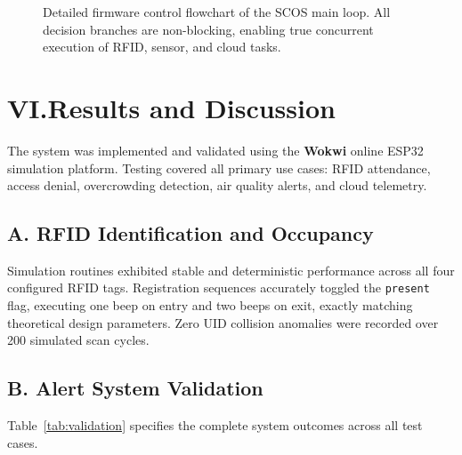 \documentclass[12pt,a4paper]{article}
\begin{document}
\begin{figure}[H]
\caption{Detailed firmware control flowchart of the SCOS main loop. All decision branches
are non-blocking, enabling true concurrent execution of RFID, sensor, and cloud tasks.}
\label{fig:flowchart}
\end{figure}

\section*{VI.\quad Results and Discussion}

The system was implemented and validated using the \textbf{Wokwi} online ESP32 simulation
platform. Testing covered all primary use cases: RFID attendance, access denial,
overcrowding detection, air quality alerts, and cloud telemetry.

\subsection*{A. RFID Identification and Occupancy}

Simulation routines exhibited stable and deterministic performance across all four
configured RFID tags. Registration sequences accurately toggled the \texttt{present} flag,
executing one beep on entry and two beeps on exit, exactly matching theoretical design
parameters. Zero UID collision anomalies were recorded over 200 simulated scan cycles.

\subsection*{B. Alert System Validation}

Table~\ref{tab:validation} specifies the complete system outcomes across all test cases.
\end{document}
